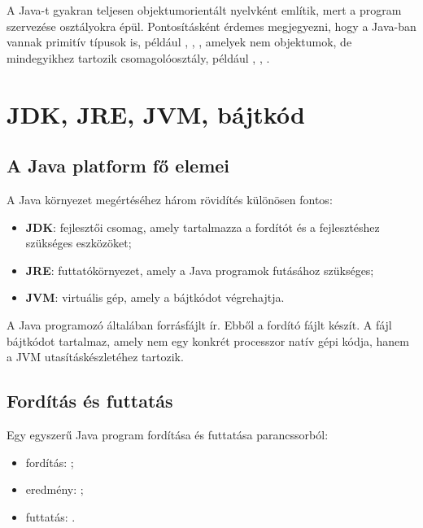 \begin{warningbox}
A Java-t gyakran teljesen objektumorientált nyelvként említik, mert a program szervezése osztályokra épül. Pontosításként érdemes megjegyezni, hogy a Java-ban vannak primitív típusok is, például , , , amelyek nem objektumok, de mindegyikhez tartozik csomagolóosztály, például , , .
\end{warningbox}

\section{JDK, JRE, JVM, bájtkód}

\subsection{A Java platform fő elemei}

A Java környezet megértéséhez három rövidítés különösen fontos:

\begin{itemize}
  \item \textbf{JDK}: fejlesztői csomag, amely tartalmazza a fordítót és a fejlesztéshez szükséges eszközöket;
  \item \textbf{JRE}: futtatókörnyezet, amely a Java programok futásához szükséges;
  \item \textbf{JVM}: virtuális gép, amely a bájtkódot végrehajtja.
\end{itemize}

A Java programozó általában  forrásfájlt ír. Ebből a  fordító  fájlt készít. A  fájl bájtkódot tartalmaz, amely nem egy konkrét processzor natív gépi kódja, hanem a JVM utasításkészletéhez tartozik.



\subsection{Fordítás és futtatás}

Egy egyszerű Java program fordítása és futtatása parancssorból:

\begin{itemize}
  \item fordítás: ;
  \item eredmény: ;
  \item futtatás: .
\end{itemize}


